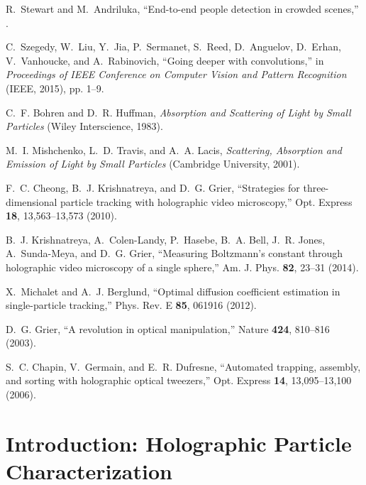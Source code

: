 \documentclass[10pt,letterpaper]{article}
\begin{document}
\begin{thebibliography}{10}
R.~Stewart and M.~Andriluka, \enquote{End-to-end people detection in crowded
  scenes,} .

C.~Szegedy, W.~Liu, Y.~Jia, P.~Sermanet, S.~Reed, D.~Anguelov, D.~Erhan,
  V.~Vanhoucke, and A.~Rabinovich, \enquote{Going deeper with convolutions,} 
  in
  \emph{Proceedings of IEEE Conference on Computer Vision and Pattern Recognition}
  (IEEE, 2015), pp. 1--9.

C.~F. Bohren and D.~R. Huffman, \emph{Absorption and Scattering of Light by
  Small Particles} (Wiley Interscience, 1983).

M.~I. Mishchenko, L.~D. Travis, and A.~A. Lacis, \emph{Scattering, Absorption
  and Emission of Light by Small Particles} (Cambridge University,
  2001).

F.~C. Cheong, B.~J. Krishnatreya, and D.~G. Grier, \enquote{Strategies for
  three-dimensional particle tracking with holographic video microscopy,} Opt.
  Express \textbf{18}, 13,563--13,573 (2010).

B.~J. Krishnatreya, A.~Colen-Landy, P.~Hasebe, B.~A. Bell, J.~R. Jones,
  A.~Sunda-Meya, and D.~G. Grier, \enquote{Measuring {Boltzmann}'s constant
  through holographic video microscopy of a single sphere,} Am. J. Phys.
  \textbf{82}, 23--31 (2014).

X.~Michalet and A.~J. Berglund, \enquote{Optimal diffusion coefficient
  estimation in single-particle tracking,} Phys. Rev. E \textbf{85}, 061916
  (2012).

D.~G. Grier, \enquote{A revolution in optical manipulation,} Nature
  \textbf{424}, 810--816 (2003).

S.~C. Chapin, V.~Germain, and E.~R. Dufresne, \enquote{Automated trapping,
  assembly, and sorting with holographic optical tweezers,} Opt. Express
  \textbf{14}, 13,095--13,100 (2006).

\end{thebibliography}

\section{Introduction: Holographic Particle Characterization}
\end{document}
